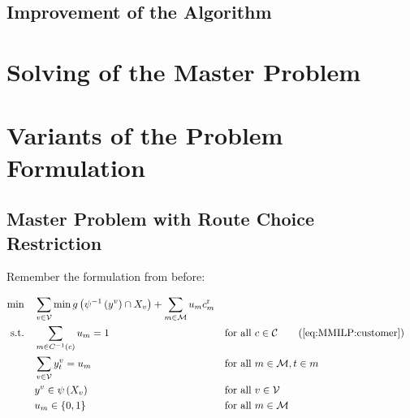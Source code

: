 
\subsection{Improvement of the Algorithm}


\section{Solving of the Master Problem}
\label{sec:solving_masterproblem}


\section{Variants of the Problem Formulation}

\subsection{Master Problem with Route Choice Restriction}

Remember the formulation from before:

\begin{align*}
	\min \quad & \sum_{v\in\mathcal{V}}\min g\left(\psi^{-1}\left(y^v\right)\cap X_v\right) + \sum_{m\in\mathcal{M}}u_m\croute_m \\
	\text{s.t.} \quad & \sum_{m\in C^{-1}(c)} u_m = 1 && \text{for all } c\in\mathcal{C} \tag{\ref{eq:MMILP:customer}} \\
	& \sum_{v\in\mathcal{V}}y^v_t = u_m && \text{for all } m\in\mathcal{M},t\in m \\
	& y^v\in \psi\left(X_v\right) && \text{for all } v\in\mathcal{V} \\
	& u_m\in\{0,1\} && \text{for all } m\in\mathcal{M}
\end{align*}

